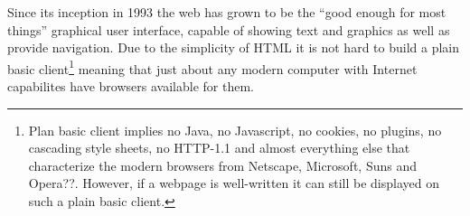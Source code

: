 Since its inception in 1993 the web has grown to be the ``good enough
for most things'' graphical user interface, capable of showing text
and graphics as well as provide navigation.  Due to the simplicity of
HTML it is not hard to build a plain basic client\footnote{Plan basic
  client implies no Java, no Javascript, no cookies, no plugins, no
  cascading style sheets, no HTTP-1.1 and almost everything else that
  characterize the modern browsers from Netscape, Microsoft, Suns and
  Opera\textsf{??}.  However, if a webpage is well-written it can still
  be displayed on such a plain basic client. } meaning that just about
any modern computer with Internet capabilites have browsers available
for them.









